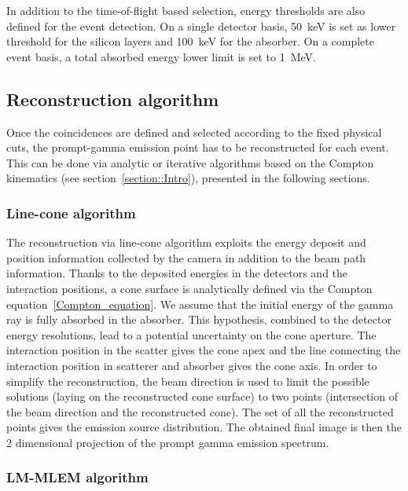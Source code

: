 In addition to the time-of-flight based selection, energy thresholds are also defined for the event detection. On a single detector basis, 50~keV is set as lower threshold for the silicon layers and 100~keV for the absorber. On a complete event basis, a total absorbed energy lower limit is set to 1~MeV.

\subsection{Reconstruction algorithm}

Once the coincidences are defined and selected according to the fixed physical cuts, the prompt-gamma emission point has to be reconstructed for each event. This can be done via analytic or iterative algorithms based on the Compton kinematics (see section~\ref{section::Intro}), presented in the following sections.\\

\subsubsection{Line-cone algorithm}
The reconstruction via line-cone algorithm exploits the energy deposit and position information collected by the camera in addition to the beam path information. Thanks to the deposited energies in the detectors and the interaction positions, a cone surface is analytically defined via the Compton equation~\ref{Compton_equation}.
\newline
We assume that the initial energy of the gamma ray is fully absorbed in the absorber. This hypothesis, combined to the detector energy resolutions, lead to a potential uncertainty on the cone aperture. The interaction position in the scatter gives the cone apex and the line connecting the interaction position in scatterer and absorber gives the cone axis. In order to simplify the reconstruction, the beam direction is used to limit the possible solutions (laying on the reconstructed cone surface) to two points (intersection of the beam direction and the reconstructed cone). The set of all the reconstructed points gives the emission source distribution. The obtained final image is then the 2 dimensional projection of the prompt gamma emission spectrum. 

\subsubsection{LM-MLEM algorithm}	

